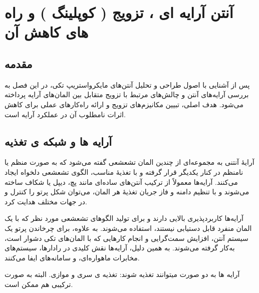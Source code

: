 \clearpage
\chapter{آنتن آرایه ای ، تزویج ( کوپلینگ ) و راه های کاهش آن}
\label{ch:2}
\section{مقدمه}
پس از آشنایی با اصول طراحی و تحلیل آنتن‌های مایکرواستریپ تکی، در این فصل به بررسی آرایه‌های آنتن و چالش‌های مرتبط با تزویج متقابل
 بین المان‌های آرایه پرداخته می‌شود. هدف اصلی، تبیین مکانیزم‌های تزویج و ارائه راه‌کارهای عملی برای کاهش اثرات نامطلوب آن در عملکرد آرایه است.
 
\section{آرایه ها و شبکه ی تغذیه}
آرایهٔ آنتنی به مجموعه‌ای از چندین المان تشعشعی گفته می‌شود که به صورت منظم یا نامنظم در کنار یکدیگر قرار گرفته و با تغذیهٔ مناسب، الگوی تشعشعی دلخواه ایجاد می‌کنند. آرایه‌ها معمولاً از ترکیب آنتن‌های ساده‌ای مانند پچ، دیپل یا شکاف ساخته می‌شوند و با تنظیم دامنه و فاز جریان تغذیهٔ هر المان، می‌توان شکل پرتو را کنترل و در جهات مختلف هدایت کرد.


آرایه‌ها کاربردپذیری بالایی دارند و برای تولید الگوهای تشعشعی مورد نظر که با یک المان منفرد قابل دستیابی نیستند، استفاده می‌شوند. به علاوه، برای چرخاندن پرتو یک سیستم آنتن، افزایش سمت‌گرایی
 و انجام کارهایی که با المان‌های تکی دشوار است، به‌کار گرفته می‌شوند. به همین دلیل، آرایه‌ها نقش کلیدی در رادارها، سیستم‌های مخابرات ماهواره‌ای،
  و سامانه‌های
   ایفا می‌کنند.
   
   
   آرایه ها به دو صورت میتوانند تغذیه شوند:‌ تغذیه ی سری و موازی. البته به صورت ترکیبی هم ممکن است.
   

